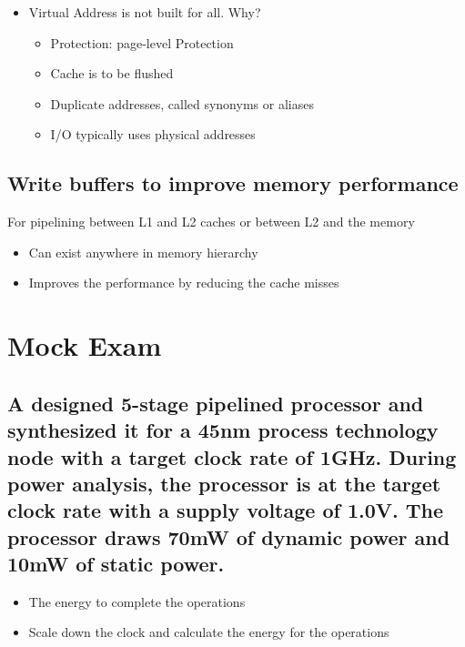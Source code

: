 \documentclass[11pt]{article}
\begin{document}
\begin{enumerate}
\begin{itemize}
        \item Virtual Address is not built for all. Why?
        \begin{itemize}
            \item Protection: page-level Protection
            \item Cache is to be flushed
            \item Duplicate addresses, called synonyms or aliases
            \item I/O typically uses physical addresses
        \end{itemize}
    \end{itemize}
\end{enumerate}

\subsection {Write buffers to improve memory performance}
For pipelining between L1 and L2 caches or between L2 and the memory
\begin{itemize}
    \item Can exist anywhere in memory hierarchy
    \item Improves the performance by reducing the cache misses
\end{itemize}

\newpage

\section{Mock Exam}

\subsection {A designed 5-stage pipelined processor and synthesized it for a 45nm process technology node with a target clock rate of 1GHz. During power analysis, the processor is at the target clock rate with a supply voltage of 1.0V. The processor draws 70mW of dynamic power and 10mW of static power.}
    \begin{itemize}
        \item The energy to complete the operations
        \item Scale down the clock and calculate the energy for the operations
    \end{itemize}
\end{document}
